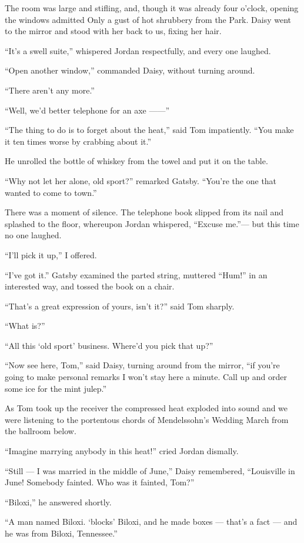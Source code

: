 \documentclass{znotebook}
\begin{document}
The room was large and stifling, and, though it was already four o'clock, opening the windows admitted Only a gust of hot shrubbery from the Park. Daisy went to the mirror and stood with her back to us, fixing her hair.

``It's a swell suite,'' whispered Jordan respectfully, and every one laughed.

``Open another window,'' commanded Daisy, without turning around.

``There aren't any more.''

``Well, we'd better telephone for an axe ——''

``The thing to do is to forget about the heat,'' said Tom impatiently. ``You make it ten times worse by crabbing about it.''

He unrolled the bottle of whiskey from the towel and put it on the table.

``Why not let her alone, old sport?'' remarked Gatsby. ``You're the one that wanted to come to town.''

There was a moment of silence. The telephone book slipped from its nail and splashed to the floor, whereupon Jordan whispered, ``Excuse me.''— but this time no one laughed.

``I'll pick it up,'' I offered.

``I've got it.'' Gatsby examined the parted string, muttered ``Hum!'' in an interested way, and tossed the book on a chair.

``That's a great expression of yours, isn't it?'' said Tom sharply.

``What is?''

``All this ‘old sport' business. Where'd you pick that up?''

``Now see here, Tom,'' said Daisy, turning around from the mirror, ``if you're going to make personal remarks I won't stay here a minute. Call up and order some ice for the mint julep.''

As Tom took up the receiver the compressed heat exploded into sound and we were listening to the portentous chords of Mendelssohn's Wedding March from the ballroom below.

``Imagine marrying anybody in this heat!'' cried Jordan dismally.

``Still — I was married in the middle of June,'' Daisy remembered, ``Louisville in June! Somebody fainted. Who was it fainted, Tom?''

``Biloxi,'' he answered shortly.

``A man named Biloxi. ‘blocks' Biloxi, and he made boxes — that's a fact — and he was from Biloxi, Tennessee.''
\end{document}
